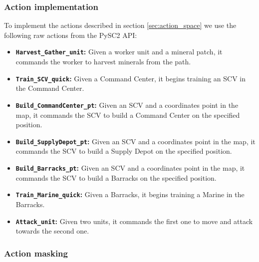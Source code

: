 \subsubsection*{Action implementation}

To implement the actions described in section \ref{sec:action_space} we use the following raw actions from the PySC2 API:

\begin{itemize}
    \item \textbf{\texttt{Harvest\_Gather\_unit}:} Given a worker unit and a mineral patch, it commands the worker to harvest minerals from the path.
    \item \textbf{\texttt{Train\_SCV\_quick}:} Given a Command Center, it begins training an SCV in the Command Center.
    \item \textbf{\texttt{Build\_CommandCenter\_pt}:} Given an SCV and a coordinates point in the map, it commands the SCV to build a Command Center on the specified position.
    \item \textbf{\texttt{Build\_SupplyDepot\_pt}:} Given an SCV and a coordinates point in the map, it commands the SCV to build a Supply Depot on the specified position.
    \item \textbf{\texttt{Build\_Barracks\_pt}:} Given an SCV and a coordinates point in the map, it commands the SCV to build a Barracks on the specified position.
    \item \textbf{\texttt{Train\_Marine\_quick}:} Given a Barracks, it begins training a Marine in the Barracks.
    \item \textbf{\texttt{Attack\_unit}:} Given two units, it commands the first one to move and attack towards the second one.
\end{itemize}

\subsubsection*{Action masking}

